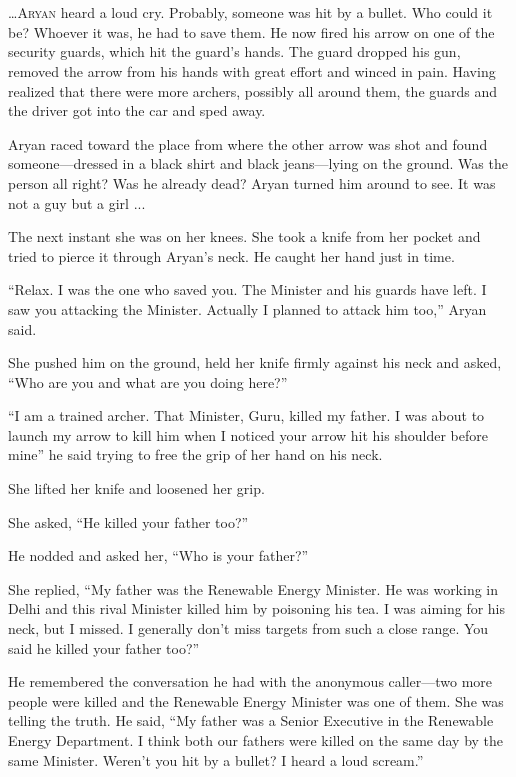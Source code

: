 \chapter{}

\lettrine{…}{Aryan} heard a loud cry. Probably, someone was hit by a bullet. Who could it
be? Whoever it was, he had to save them. He now fired his arrow on one of the
security guards, which hit the guard's hands. The guard dropped his gun, removed
the arrow from his hands with great effort and winced in pain. Having realized
that there were more archers, possibly all around them, the guards and the
driver got into the car and sped away.

Aryan raced toward the place from where the other arrow was shot and found
someone—dressed in a black shirt and black jeans—lying on the ground. Was
the person all right? Was he already dead? Aryan turned him around to see. It
was not a guy but a girl ...

The next instant she was on her knees. She took a knife from her pocket and
tried to pierce it through Aryan's neck. He caught her hand just in time.

“Relax. I was the one who saved you. The Minister and his guards have left. I
saw you attacking the Minister. Actually I planned to attack him too,” Aryan
said.

She pushed him on the ground, held her knife firmly against his neck and asked,
“Who are you and what are you doing here?”

“I am a trained archer. That Minister, Guru, killed my father. I was about to
launch my arrow to kill him when I noticed your arrow hit his shoulder before
mine” he said trying to free the grip of her hand on his neck.

She lifted her knife and loosened her grip.

She asked, “He killed your father too?”

He nodded and asked her, “Who is your father?”

She replied, “My father was the Renewable Energy Minister. He was working in
Delhi and this rival Minister killed him by poisoning his tea. I was aiming for
his neck, but I missed. I generally don't miss targets from such a close range.
You said he killed your father too?”

He remembered the conversation he had with the anonymous caller—two more people
were killed and the Renewable Energy
Minister was one of them. She was telling the truth. He said, “My father was a
Senior Executive in the Renewable Energy Department. I think both our fathers
were killed on the same day by the same Minister. Weren't you hit by a bullet? I
heard a loud scream.”

